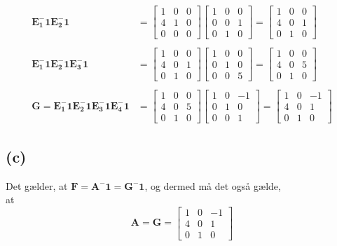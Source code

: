 \documentclass[12pt]{article}
\begin{document}
\begin{align*}
\mathbf{E_1^-1E_2^-1}&=
\begin{bmatrix}
1&0&0\\
4&1&0\\
0&0&0
\end{bmatrix}
\begin{bmatrix}
1&0&0\\
0&0&1\\
0&1&0
\end{bmatrix}
=
\begin{bmatrix}
1&0&0\\
4&0&1\\
0&1&0
\end{bmatrix}
\\\\
\mathbf{E_1^-1E_2^-1E_3^-1}&=
\begin{bmatrix}
1&0&0\\
4&0&1\\
0&1&0
\end{bmatrix}
\begin{bmatrix}
1&0&0\\
0&1&0\\
0&0&5
\end{bmatrix}
=
\begin{bmatrix}
1&0&0\\
4&0&5\\
0&1&0
\end{bmatrix}
\\\\
\mathbf{G=E_1^-1E_2^-1E_3^-1E_4^-1}&=
\begin{bmatrix}
1&0&0\\
4&0&5\\
0&1&0
\end{bmatrix}
\begin{bmatrix}
1&0&-1\\
0&1&0\\
0&0&1
\end{bmatrix}
=
\begin{bmatrix}
1&0&-1\\
4&0&1\\
0&1&0
\end{bmatrix}
\end{align*}

\subsection{(c)}
Det gælder, at $\mathbf{F}=\mathbf{A^-1}=\mathbf{G^-1}$, og dermed må det også gælde, \\
at $$\mathbf{A=G}
=\begin{bmatrix}
1&0&-1\\
4&0&1\\
0&1&0
\end{bmatrix}
$$
\end{document}
